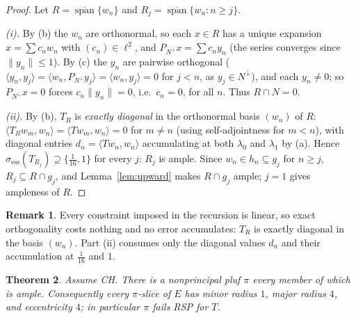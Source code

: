 \documentclass[11pt,reqno]{amsart}
\newtheorem{theorem}{Theorem}[section]
\theoremstyle{definition}
\newtheorem{remark}[theorem]{Remark}
\newcommand{\sess}{\sigma_{\mathrm{ess}}}
\newcommand{\pluf}{\pi}
\begin{document}
\begin{proof}
Let $R=\overline{\operatorname{span}}\{w_n\}$ and
$R_j=\overline{\operatorname{span}}\{w_n:n\ge j\}$.

\emph{(i).} By (b) the $w_n$ are orthonormal, so each $x\in R$ has a unique expansion
$x=\sum c_nw_n$ with $(c_n)\in\ell^2$, and $P_{N^\perp}x=\sum c_ny_n$ (the series
converges since $\|y_n\|\le1$). By (c) the $y_n$ are pairwise orthogonal
($\langle y_n,y_j\rangle=\langle w_n,P_{N^\perp}y_j\rangle=\langle w_n,y_j\rangle=0$ for
$j<n$, as $y_j\in N^\perp$), and each $y_n\neq0$; so $P_{N^\perp}x=0$ forces
$c_n\|y_n\|=0$, i.e.\ $c_n=0$, for all $n$. Thus $R\cap N=0$.

\emph{(ii).} By (b), $T_R$ is \emph{exactly diagonal} in the orthonormal basis $(w_n)$ of
$R$: $\langle T_Rw_m,w_n\rangle=\langle Tw_m,w_n\rangle=0$ for $m\neq n$ (using
self-adjointness for $m<n$), with diagonal entries
$d_n=\langle Tw_n,w_n\rangle$ accumulating at both $\lambda_0$ and $\lambda_1$ by (a).
Hence $\sess(T_{R_j})\supseteq\{\tfrac1{16},1\}$ for every $j$: $R_j$ is ample. Since
$w_n\in h_n\subseteq g_j$ for $n\ge j$, $R_j\subseteq R\cap g_j$, and
Lemma~\ref{lem:upward} makes $R\cap g_j$ ample; $j=1$ gives ampleness of $R$.
\end{proof}

\begin{remark}\label{rem:exact}
Every constraint imposed in the recursion is linear, so exact orthogonality costs
nothing and no error accumulates: $T_R$ is exactly diagonal in the basis $(w_n)$. Part
(ii) consumes only the diagonal values $d_n$ and their accumulation at
$\tfrac1{16}$ and $1$.
\end{remark}

\begin{theorem}\label{thm:CH}
Assume CH. There is a nonprincipal pluf $\pluf$ every member of which is ample.
Consequently every $\pluf$-slice of $E$ has minor radius $1$, major radius $4$, and
eccentricity $4$; in particular $\pluf$ fails RSP for $T$.
\end{theorem}
\end{document}
